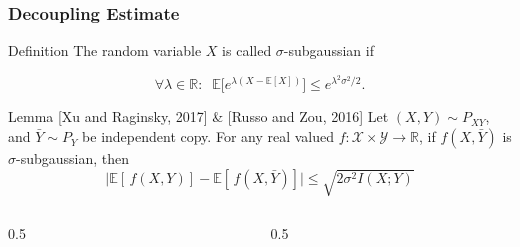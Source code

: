 \documentclass[usenames,dvipsnames, 10pt]{beamer}
\newcommand{\R}{\mathbb{R}}
\newcommand{\E}{\mathbb{E}}
\begin{document}
\begin{frame}
	\frametitle{Decoupling Estimate}
		\begin{block}{Definition}
		The random variable $X$ is called $\sigma$-subgaussian if
		\begin{small}
			\begin{equation*}
			\forall \lambda \in \R: \;\; \E\Big[e^{\lambda(X - \E[X])}\Big] \leq e^{\lambda^2\sigma^2/2}.
			\end{equation*}
		\end{small}
		\vspace{-0.5cm}
	\end{block}
	\pause
	\begin{alertblock}{Lemma {\scriptsize[Xu and Raginsky,  2017] \& [Russo and Zou,  2016]}}
		Let $(X, Y) \sim P_{XY}$, and $\bar{Y} \sim P_Y$ be independent copy. For any real valued $f:\mathcal{X}\times \mathcal{Y} \to \R$, if $f(X, \bar{Y})$ is $\sigma$-subgaussian, then
		\vspace{-0.3cm}		
		\begin{equation*}
			\big|\E[\,f(X, Y)] - \E[\,f(X, \bar{Y})]\big| \leq \sqrt{2\sigma^2I(X;Y)}
		\end{equation*}
		\vspace{-0.5cm}
	\end{alertblock}
	\vspace{-0.4cm}
	\begin{columns}
		\begin{column}{0.5\textwidth}
		\end{column}
		\begin{column}{0.5\textwidth}  %
			\begin{center}
			\begin{small}
			\end{small}
		\end{center}
		\end{column}
	\end{columns}
\end{frame}
\end{document}
